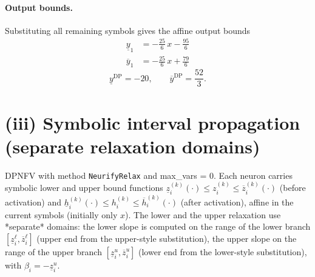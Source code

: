 \documentclass[11pt]{article}
\begin{document}
\paragraph{Output bounds.}
Substituting all remaining symbols gives the affine output bounds
\begin{align*}
\underline{y}_{1} &= -\frac{25}{6}\,x - \frac{95}{6}
\end{align*}
\begin{align*}
\overline{y}_{1} &= -\frac{25}{6}\,x + \frac{79}{6}
\end{align*}
\begin{equation*}
\underline{y}^{\text{DP}} = -20, \qquad \overline{y}^{\text{DP}} = \frac{52}{3}.
\end{equation*}

\section{(iii) Symbolic interval propagation (separate relaxation domains)}
DPNFV with method \texttt{NeurifyRelax} and max\_vars = 0. Each neuron carries symbolic lower and upper bound functions
$\underline{z}^{(k)}_i(\cdot) \le z^{(k)}_i \le \overline{z}^{(k)}_i(\cdot)$ (before activation)
and $\underline{h}^{(k)}_i(\cdot) \le h^{(k)}_i \le \overline{h}^{(k)}_i(\cdot)$ (after activation),
affine in the current symbols (initially only $x$).
The lower and the upper relaxation use *separate* domains:
the lower slope is computed on the range of the lower branch
$[\underline{z}^{\ell}_i, \overline{z}^{\ell}_i]$ (upper end from the upper-style substitution),
the upper slope on the range of the upper branch
$[\underline{z}^{u}_i, \overline{z}^{u}_i]$ (lower end from the lower-style substitution),
with $\beta_i = -\underline{z}^{u}_i$.
\end{document}
